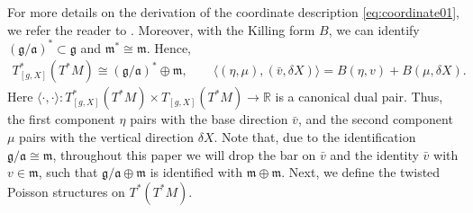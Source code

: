 \documentclass[11pt]{amsart}
\theoremstyle{definition}
\theoremstyle{plain}
\theoremstyle{conclusion}
\begin{document}
For more details on the derivation of the coordinate description \eqref{eq:coordinate01}, we refer the reader to \cite{Thimm1981,MR2141306}. Moreover, with the Killing form $B$, we can identify $(\mathfrak{g}/\mathfrak{a})^* \subset \mathfrak{g}$ and $\mathfrak{m}^*\cong \mathfrak{m}$. Hence, \begin{align*}
T^*_{[g,X]}(T^*M)\cong (\mathfrak{g}/\mathfrak{a})^*  \oplus \mathfrak{m},\qquad
\langle (\eta,\mu),(\bar{v},\delta X)\rangle = B(\eta,v) + B(\mu,\delta X).
\end{align*} Here $\langle \cdot,\cdot\rangle : T_{[g,X]}^*(T^*M) \times T_{[g,X]}(T^*M) \rightarrow \mathbb{R}$ is a canonical dual pair. Thus, the first component $\eta$ pairs with the base direction $\bar{v}$, and the second component $\mu$ pairs with the vertical direction $\delta X$.
 Note that, due to the identification $\mathfrak{g}/\mathfrak{a} \cong \mathfrak{m}$, throughout this paper we will drop the bar on $\bar{v}$ and the identity $\bar{v}$ with $v \in \mathfrak{m}$, such that $\mathfrak{g}/\mathfrak{a} \oplus \mathfrak{m} $ is identified with $ \mathfrak{m} \oplus \mathfrak{m}$. Next, we define the twisted Poisson structures on $T^*(T^*M)$.
\end{document}
